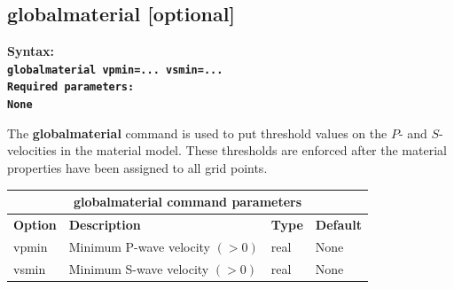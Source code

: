 \documentclass[11pt]{report}
\begin{document}
{\subsection{globalmaterial [optional]}
\label{keyword:globalmaterial}
\begin{flushleft}\bf
	Syntax:\\
	\tt globalmaterial vpmin=... vsmin=...\\
	\bf Required parameters:\\
	\rm None
\end{flushleft}
The {\bf globalmaterial} command is used to put threshold values on the $P$- and $S$-velocities in
the material model. These thresholds are enforced after the material properties have been assigned
to all grid points.
\begin{center}
	\begin{tabular}{|l|p{8cm}|l|l|} \hline
		\multicolumn{4}{|c|}{\bf globalmaterial command parameters}             \\ \hline
		\bf{Option} & \bf{Description}               & \bf{Type} & \bf{Default} \\ \hline \hline
		vpmin       & Minimum P-wave velocity $(>0)$ & real      & None         \\ \hline
		vsmin       & Minimum S-wave velocity $(>0)$ & real      & None         \\ \hline
	\end{tabular}
\end{center}

}
\end{document}
